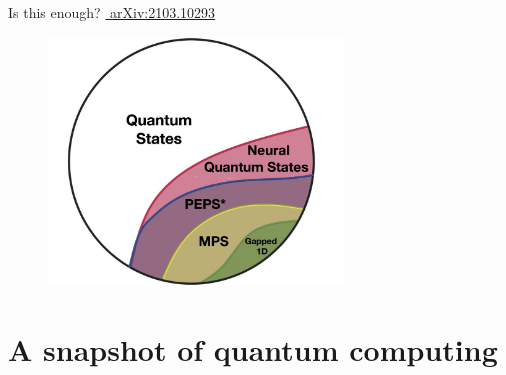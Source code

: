 \documentclass[8pt, xcolor={svgnames}, hyperref={linkcolor=black}]{beamer}
\begin{document}
\begin{frame}{Is this enough? \hfill \href{https://arxiv.org/abs/2103.10293}{\faBook\,\,arXiv:2103.10293}}
\pause
\begin{figure}
   \includegraphics[width=0.7\textwidth]{figures/complexity.jpg}
\end{figure}
\end{frame}

\section{A snapshot of quantum computing}
\end{document}
